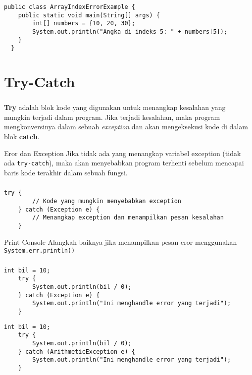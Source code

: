 \documentclass{../praktikum-ppt}
\begin{document}
    \begin{frame}[fragile]
      \frametitle{\insertsection}
      \begin{lstlisting}[caption={\textit{ArrayIndexOutOfBoundsException}}]
  public class ArrayIndexErrorExample {
    public static void main(String[] args) {
        int[] numbers = {10, 20, 30};
        System.out.println("Angka di indeks 5: " + numbers[5]); 
    }
  }
      \end{lstlisting}
    \end{frame}

    \section{Try-Catch}
    \begin{frame}
      \frametitle{\insertsection}
      \begin{definisi}
         \textbf{Try} adalah blok kode yang digunakan untuk menangkap kesalahan yang mungkin terjadi dalam program. Jika terjadi kesalahan, maka program mengkonversinya dalam sebuah \textit{exception} dan akan mengeksekusi kode di dalam blok \textbf{catch}.
      \end{definisi}
      \begin{alertblock}{Eror dan Exception}
        Jika tidak ada yang menangkap variabel exception (tidak ada \texttt{try-catch}), maka akan menyebabkan program terhenti sebelum mencapai baris kode terakhir dalam sebuah fungsi.
      \end{alertblock}
    \end{frame}

    \begin{frame}[fragile]
      \frametitle{\insertsection}
      \begin{lstlisting}[caption={Struktur \textit{Try-Catch} pada Java}]
    try {
        // Kode yang mungkin menyebabkan exception
    } catch (Exception e) {
        // Menangkap exception dan menampilkan pesan kesalahan
    }
      \end{lstlisting}
      \begin{alertblock}{Print Console}
        Alangkah baiknya jika menampilkan pesan eror menggunakan \texttt{System.err.println()} 
      \end{alertblock}
    \end{frame}

    \begin{frame}[fragile]
      \frametitle{\insertsection}
      \begin{lstlisting}[caption={Contoh \textit{Try-Catch} \#1}]
    int bil = 10;
    try {
        System.out.println(bil / 0);
    } catch (Exception e) {
        System.out.println("Ini menghandle error yang terjadi");
    }
      \end{lstlisting}
      \begin{lstlisting}[caption={Contoh \textit{Try-Catch} \#2}]
    int bil = 10;
    try {
        System.out.println(bil / 0);
    } catch (ArithmeticException e) {
        System.out.println("Ini menghandle error yang terjadi");
    }
      \end{lstlisting}
    \end{frame}
\end{document}
